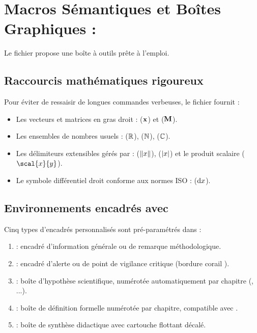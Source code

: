 \section{Macros Sémantiques et Boîtes Graphiques : }
\label{sec:macros-detail}

Le fichier  propose une boîte à outils prête à l'emploi.

\subsection{Raccourcis mathématiques rigoureux}
Pour éviter de ressaisir de longues commandes verbeuses, le fichier fournit :
\begin{itemize}
  \item Les vecteurs et matrices en gras droit :  ($\boldsymbol{\mathbf{x}}$) et  ($\boldsymbol{\mathbf{M}}$).
  \item Les ensembles de nombres usuels :  ($\mathbb{R}$),  ($\mathbb{N}$),  ($\mathbb{C}$).
  \item Les délimiteurs extensibles gérés par  :
   ($\lVert x\rVert$),
   ($\lvert x\rvert$)
  et le produit scalaire  ($\scal{x}{y}$).
  \item Le symbole différentiel droit conforme aux normes ISO :  ($\mathop{}\!\mathrm{d} x$).
\end{itemize}

\subsection{Environnements encadrés avec }
Cinq types d'encadrés personnalisés sont pré-paramétrés dans  :
\begin{enumerate}
  \item {} : encadré d'information générale ou de remarque méthodologique.
  \item {} : encadré d'alerte ou de point de vigilance critique (bordure corail ).
  \item {} : boîte d'hypothèse scientifique, numérotée automatiquement par chapitre (, ...).
  \item {} : boîte de définition formelle numérotée par chapitre, compatible avec .
  \item {} : boîte de synthèse didactique avec cartouche flottant décalé.
\end{enumerate}

